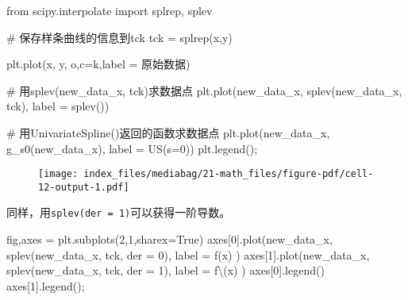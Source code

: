 \documentclass[
  letterpaper,
  DIV=11,
  numbers=noendperiod]{scrreprt}
\newenvironment{Shaded}{\begin{snugshade}}{\end{snugshade}}
\newcommand{\CharTok}[1]{\textcolor[rgb]{0.13,0.47,0.30}{#1}}
\newcommand{\CommentTok}[1]{\textcolor[rgb]{0.37,0.37,0.37}{#1}}
\newcommand{\DecValTok}[1]{\textcolor[rgb]{0.68,0.00,0.00}{#1}}
\newcommand{\ImportTok}[1]{\textcolor[rgb]{0.00,0.46,0.62}{#1}}
\newcommand{\NormalTok}[1]{\textcolor[rgb]{0.00,0.23,0.31}{#1}}
\newcommand{\OperatorTok}[1]{\textcolor[rgb]{0.37,0.37,0.37}{#1}}
\newcommand{\StringTok}[1]{\textcolor[rgb]{0.13,0.47,0.30}{#1}}
\newcommand{\VariableTok}[1]{\textcolor[rgb]{0.07,0.07,0.07}{#1}}
\begin{document}
\begin{Shaded}
\begin{Highlighting}[]
\ImportTok{from}\NormalTok{ scipy.interpolate }\ImportTok{import}\NormalTok{ splrep, splev}

\CommentTok{\# 保存样条曲线的信息到tck}
\NormalTok{tck }\OperatorTok{=}\NormalTok{ splrep(x,y)}

\NormalTok{plt.plot(x, y, }\StringTok{\textquotesingle{}o\textquotesingle{}}\NormalTok{,c}\OperatorTok{=}\StringTok{\textquotesingle{}k\textquotesingle{}}\NormalTok{,label }\OperatorTok{=} \StringTok{\textquotesingle{}原始数据\textquotesingle{}}\NormalTok{) }

\CommentTok{\# 用splev(new\_data\_x, tck)求数据点}
\NormalTok{plt.plot(new\_data\_x, splev(new\_data\_x, tck), label }\OperatorTok{=} \StringTok{\textquotesingle{}splev()\textquotesingle{}}\NormalTok{) }

\CommentTok{\# 用UnivariateSpline()返回的函数求数据点}
\NormalTok{plt.plot(new\_data\_x, g\_s0(new\_data\_x), label }\OperatorTok{=} \StringTok{\textquotesingle{}US(s=0)\textquotesingle{}}\NormalTok{) }
\NormalTok{plt.legend()}\OperatorTok{;}
\end{Highlighting}
\end{Shaded}

\begin{figure}[H]

{\centering \texttt{[image: index\_files/mediabag/21-math\_files/figure-pdf/cell-12-output-1.pdf]}

}

\end{figure}

同样，用\texttt{splev(der\ =\ 1)}可以获得一阶导数。

\begin{Shaded}
\begin{Highlighting}[]
\NormalTok{fig,axes }\OperatorTok{=}\NormalTok{ plt.subplots(}\DecValTok{2}\NormalTok{,}\DecValTok{1}\NormalTok{,sharex}\OperatorTok{=}\VariableTok{True}\NormalTok{)}
\NormalTok{axes[}\DecValTok{0}\NormalTok{].plot(new\_data\_x, splev(new\_data\_x, tck, der }\OperatorTok{=} \DecValTok{0}\NormalTok{), label }\OperatorTok{=} \StringTok{\textquotesingle{}f(x)\textquotesingle{}}\NormalTok{ )}
\NormalTok{axes[}\DecValTok{1}\NormalTok{].plot(new\_data\_x, splev(new\_data\_x, tck, der }\OperatorTok{=} \DecValTok{1}\NormalTok{), label }\OperatorTok{=} \StringTok{\textquotesingle{}f}\CharTok{\textbackslash{}\textquotesingle{}}\StringTok{(x)\textquotesingle{}}\NormalTok{ )}
\NormalTok{axes[}\DecValTok{0}\NormalTok{].legend()}
\NormalTok{axes[}\DecValTok{1}\NormalTok{].legend()}\OperatorTok{;}
\end{Highlighting}
\end{Shaded}
\end{document}
